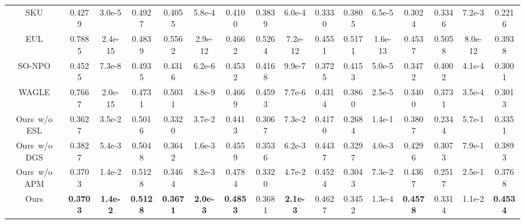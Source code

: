 \documentclass{article}
\theoremstyle{plain}
\theoremstyle{definition}
\theoremstyle{remark}
\begin{document}
\begin{table}[tbh]
{\begin{tabular}{c|cc|c|cc|c|cc|c|cc|c|cc|c}
			SKU
			& 0.4279 & 3.0e-5 & 0.4927
			& 0.4055 & 5.8e-4 & 0.4100
			& 0.3839 & 6.0e-4 & 0.3330
			& 0.3805 & 6.5e-5 & 0.3024
			& 0.3346 & 7.2e-3 & 0.2216 \\
			EUL
			& 0.7885 & 2.4e-15 & 0.4839
			& 0.5562 & 2.9e-12 & 0.4662
			& 0.5264 & 7.2e-12 & 0.4551
			& 0.5171 & 1.6e-13 & 0.4537
			& 0.5058 & 8.0e-12 & 0.3938 \\
			SO-NPO
			& 0.4525 & 7.3e-8 & 0.4935
			& 0.4316 & 6.2e-6 & 0.4532
			& 0.4168 & 9.9e-7 & 0.3725
			& 0.4153 & 5.0e-5 & 0.3472
			& 0.4002 & 4.1e-4 & 0.3001 \\
			WAGLE
			& 0.7667 & 2.0e-15 & 0.4731
			& 0.5031 & 4.8e-9 & 0.4669
			& 0.4593 & 7.7e-6 & 0.4314
			& 0.3860 & 2.5e-5 & 0.3400
			& 0.3731 & 3.5e-4 & 0.3013 \\
			\hline
			\rowcolor{gray!20}
			Ours~w/o ESL
			& 0.3627 & 3.5e-2 & 0.5016
			& 0.3320 & 3.7e-2 & 0.4413
			& 0.3067 & 7.3e-2 & 0.4170
			& 0.2684 & 1.4e-1 & 0.3807
			& 0.2344 & 5.7e-1 & 0.3351 \\
			\rowcolor{gray!20}
			Ours~w/o DGS
			& 0.3827 & 5.4e-3 & 0.5048
			& 0.3642 & 1.6e-3 & 0.4559
			& 0.3536 & 6.2e-3 & 0.4437
			& 0.3297 & 4.0e-3 & 0.4296
			& 0.3073 & 7.9e-1 & 0.3893 \\
			\rowcolor{gray!20}
			Ours~w/o APM
			& 0.3703 & 1.4e-2 & 0.5128
			& 0.3464 & 8.2e-3 & 0.4784
			& 0.3320 & 4.7e-2 & 0.4524
			& 0.3043 & 7.3e-2 & 0.4367
			& 0.2517 & 2.5e-1 & 0.3768 \\
			\hline
			Ours 
			& \textbf{0.3703} & \textbf{1.4e-2} & \textbf{0.5128}
			& \textbf{0.3671} & \textbf{2.0e-3} & \textbf{0.4853}
			& 0.3681 & \textbf{2.1e-3} & 0.4627
			& 0.3452 & 1.3e-4 & \textbf{0.4578}
			& 0.3314 & 1.1e-2 & \textbf{0.4534} \\
			\bottomrule
		\end{tabular}
	}
	\label{tab:tofu_phi}
\end{table}
\end{document}
